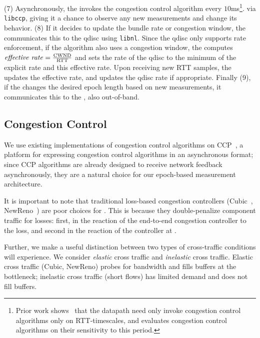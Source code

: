 (7) Asynchronously, the \inbox invokes the congestion control algorithm every $10$ms\footnote{Prior work shows~\cite{ccp} that the datapath need only invoke congestion control algorithms only on RTT-timescales, and evaluates congestion control algorithms on their sensitivity to this period.}.
via \texttt{libccp},
giving it a chance to observe any new measurements and change its behavior. (8) If it decides to update
the bundle rate or congestion window, the \inbox communicates this to the qdisc
using \texttt{libnl}. Since the qdisc only supports rate enforcement, if the algorithm
also uses a congestion window, the \inbox computes $\text{\emph{effective rate}} = \frac{\text{CWND}}{\text{RTT}}$
and sets the rate of the qdisc to the minimum of the explicit rate and this effective rate.
Upon receiving new RTT samples, the \inbox updates the effective rate, and updates the qdisc rate if appropriate.
Finally (9), if the \inbox changes the desired epoch length based on new measurements, it communicates this to the \outbox, also out-of-band.


\subsection{Congestion Control}\label{s:impl:cc}
We use existing implementations of congestion control algorithms on CCP~\cite{ccp}, a platform for expressing congestion control algorithms in an asynchronous format; since CCP algorithms are already designed to receive network feedback asynchronously, they are a natural choice for our epoch-based measurement architecture. 

It is important to note that traditional loss-based congestion controllers (\ie Cubic~\cite{cubic}, NewReno~\cite{newreno}) are poor choices for \name. 
This is because they double-penalize component traffic for losses: first, in the reaction of the end-to-end congestion controller to the loss, and second in the reaction of the controller at \name.

%
Further, we make a useful distinction between two types of cross-traffic conditions \name will experience.
We consider \emph{elastic} cross traffic and \emph{inelastic} cross traffic.
Elastic cross traffic (\eg Cubic, NewReno) probes for bandwidth and fills buffers at the bottleneck; inelastic cross traffic (\eg short flows) has limited demand and does not fill buffers.

